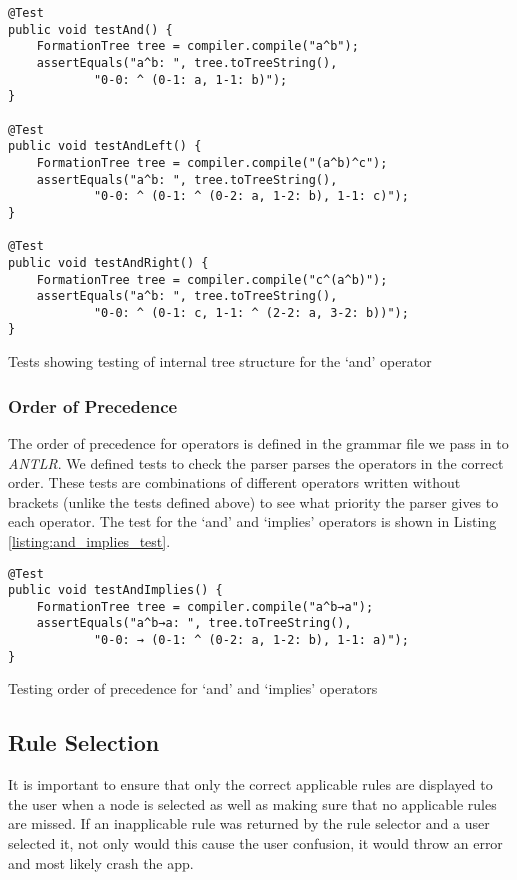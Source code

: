\documentclass[draft]{report}
\begin{document}
\begin{listing}[ht]
\begin{verbatim}
@Test
public void testAnd() {
    FormationTree tree = compiler.compile("a^b");
    assertEquals("a^b: ", tree.toTreeString(), 
            "0-0: ^ (0-1: a, 1-1: b)");
}

@Test
public void testAndLeft() {
    FormationTree tree = compiler.compile("(a^b)^c");
    assertEquals("a^b: ", tree.toTreeString(), 
            "0-0: ^ (0-1: ^ (0-2: a, 1-2: b), 1-1: c)");
}

@Test
public void testAndRight() {
    FormationTree tree = compiler.compile("c^(a^b)");
    assertEquals("a^b: ", tree.toTreeString(), 
            "0-0: ^ (0-1: c, 1-1: ^ (2-2: a, 3-2: b))");
}
\end{verbatim}
\caption{Tests showing testing of internal tree structure for the `and' operator}
\label{listing:and_tests}
\end{listing}

\subsubsection{Order of Precedence}

The order of precedence for operators is defined in the grammar file we pass in to \emph{ANTLR}. We defined tests to check the parser parses the operators in the correct order. These tests are combinations of different operators written without brackets (unlike the tests defined above) to see what priority the parser gives to each operator. The test for the `and' and `implies' operators is shown in Listing \ref{listing:and_implies_test}.

\begin{listing}[ht]
\begin{verbatim}
@Test
public void testAndImplies() {
    FormationTree tree = compiler.compile("a^b→a");
    assertEquals("a^b→a: ", tree.toTreeString(), 
            "0-0: → (0-1: ^ (0-2: a, 1-2: b), 1-1: a)");
}
\end{verbatim}
\caption{Testing order of precedence for `and' and `implies' operators}
\label{listing:and_implies_test}
\end{listing}

\subsection{Rule Selection}

It is important to ensure that only the correct applicable rules are displayed to the user when a node is selected as well as making sure that no applicable rules are missed. If an inapplicable rule was returned by the rule selector and a user selected it, not only would this cause the user confusion, it would throw an error and most likely crash the app.
\end{document}

